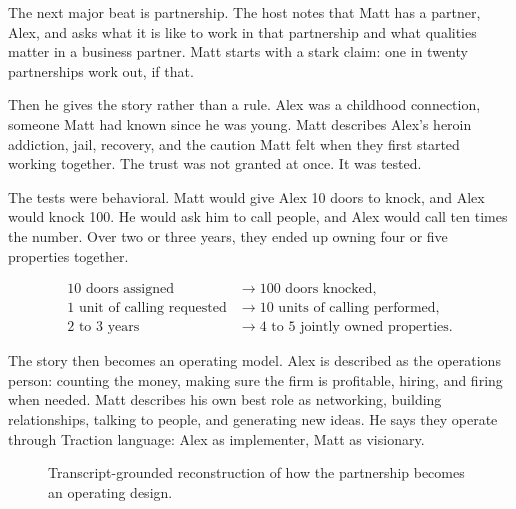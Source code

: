 The next major beat is partnership. The host notes that Matt has a partner, Alex, and asks what it is like to work in that partnership and what qualities matter in a business partner. Matt starts with a stark claim: one in twenty partnerships work out, if that.

Then he gives the story rather than a rule. Alex was a childhood connection, someone Matt had known since he was young. Matt describes Alex's heroin addiction, jail, recovery, and the caution Matt felt when they first started working together. The trust was not granted at once. It was tested.

The tests were behavioral. Matt would give Alex 10 doors to knock, and Alex would knock 100. He would ask him to call people, and Alex would call ten times the number. Over two or three years, they ended up owning four or five properties together.

\begin{align}
10\text{ doors assigned} &\longrightarrow 100\text{ doors knocked},\\
1\text{ unit of calling requested} &\longrightarrow 10\text{ units of calling performed},\\
2\text{ to }3\text{ years} &\longrightarrow 4\text{ to }5\text{ jointly owned properties}.
\end{align}

The story then becomes an operating model. Alex is described as the operations person: counting the money, making sure the firm is profitable, hiring, and firing when needed. Matt describes his own best role as networking, building relationships, talking to people, and generating new ideas. He says they operate through Traction language: Alex as implementer, Matt as visionary.

\begin{figure}
\centering
{}
\caption{Transcript-grounded reconstruction of how the partnership becomes an operating design.}
\end{figure}

